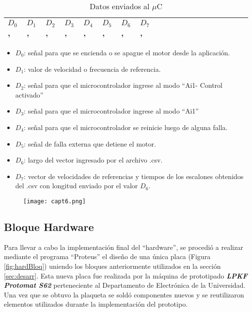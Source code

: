 \begin{enumerate}
\begin{table}[H]
	\centering
	\begin{tabular}{|l|l|l|l|l|l|l|l|l|l|l|l|l|l|l|l|l|l|l|l|}
		\hline
			$D_0$ , & $D_1$ , & $D_2$ , & $D_3$ , & $D_4$ , & $D_5$ , & $D_6$ ,  & $D_7$ , \\ \hline
	\end{tabular}
\caption{Datos enviados al $\mu$C}
\label{tab:Datosenviados}
\end{table}

\begin{itemize}
\item $D_0$: señal para que se encienda o se apague el motor desde la aplicación.
\item $D_1$: valor de velocidad o frecuencia de referencia.
\item $D_2$: señal para que el microcontrolador ingrese al modo “Ai1- Control activado”
\item $D_3$: señal para que el microcontrolador ingrese al modo “Ai1”
\item $D_4$: señal para que el microcontrolador se reinicie luego de alguna falla.
\item $D_5$: señal de falla externa que detiene el motor.
\item $D_6$: largo del vector ingresado por el archivo .csv.
\item $D_7$: vector de velocidades de referencias y tiempos de los escalones obtenidos del .csv con longitud enviado por el valor $D_6$.
\end{itemize}	

\end{enumerate}
\begin{figure}[H]
	\centering
	\texttt{[image: capt6.png]}
	\label{fig:capt6}
\end{figure}

\subsection{Bloque Hardware} \label{sec:hard}

Para llevar a cabo la implementación final del “hardware”, se procedió a realizar mediante el programa “Proteus” el diseño de una única placa (Figura \ref{fig:hardBloq}) uniendo los bloques anteriormente utilizados en la sección \ref{sec:desarr}. Esta nueva placa fue realizada por la máquina de prototipado \textbf{\textit{LPKF Protomat S62}} perteneciente al Departamento de Electrónica de la Universidad. Una vez que se obtuvo la plaqueta se soldó componentes nuevos y se reutilizaron elementos utilizados durante la implementación del prototipo.  

